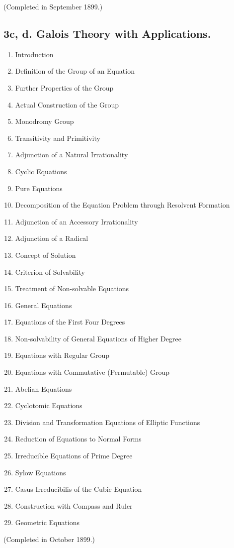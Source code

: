 \vspace{-0.1cm}
{\normalfont(Completed in September 1899.)}

\subsection*{\small3c, d. Galois Theory with Applications. }

\begin{enumerate}[itemsep=0pt]
    \item Introduction
    \item Definition of the Group of an Equation
    \item Further Properties of the Group
    \item Actual Construction of the Group
    \item Monodromy Group
    \item Transitivity and Primitivity
    \item Adjunction of a Natural Irrationality
    \item Cyclic Equations
    \item Pure Equations
    \item Decomposition of the Equation Problem through Resolvent Formation
    \item Adjunction of an Accessory Irrationality
    \item Adjunction of a Radical
    \item Concept of Solution
    \item Criterion of Solvability
    \item Treatment of Non-solvable Equations
    \item General Equations
    \item Equations of the First Four Degrees
    \item Non-solvability of General Equations of Higher Degree
    \item Equations with Regular Group
    \item Equations with Commutative (Permutable) Group
    \item Abelian Equations
    \item Cyclotomic Equations
    \item Division and Transformation Equations of Elliptic Functions
    \item Reduction of Equations to Normal Forms
    \item Irreducible Equations of Prime Degree
    \item Sylow Equations
    \item Casus Irreducibilis of the Cubic Equation
    \item Construction with Compass and Ruler
    \item Geometric Equations
\end{enumerate}

\vspace{-0.1cm}
{\normalfont(Completed in October 1899.)}
